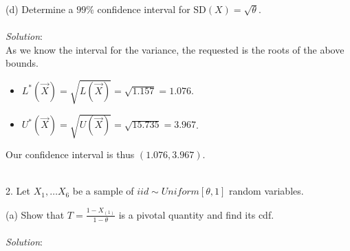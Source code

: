 \documentclass[12pt]{article}
\newcommand{\XB}{\color{black}}
\newcommand{\XBB}{\color{blue}}
\newcommand{\ds}{\displaystyle}
\begin{document}
\vspace{2.5mm}

(d) Determine a $ 99\% $ confidence interval for $ \text{SD}(X) = \sqrt{\theta} $. \\
\vspace{2.5mm} \\
\textit{Solution}:
\vspace{2.5mm} \\

\noindent
As we know the interval for the variance, the requested is the roots of the above bounds. \\

\begin{itemize}
    \item $ \ds L^{*}(\overrightarrow{X}) = \sqrt{L(\overrightarrow{X})} = \sqrt{1.157} = 1.076 $. \\
    \item $ \ds U^{*}(\overrightarrow{X}) = \sqrt{U(\overrightarrow{X})} = \sqrt{15.735} = 3.967 $. \\
\end{itemize}

\noindent
Our confidence interval is thus $ (1.076, 3.967) $. \\

\vspace{2.5mm}

\newpage
\XBB\hrulefill\XB \\

2. Let $ X_{1}, \dots X_{6} $ be a sample of $ iid \sim Uniform[\theta, 1] $ random variables. \\ 

\XBB\hrulefill\XB 
\vspace{5mm} 

(a) Show that $ \ds T = \frac{1 - X_{(1)}}{1 - \theta} $ is a pivotal quantity and find its cdf. \\
\vspace{2.5mm} \\
\textit{Solution}:
\vspace{2.5mm} \\
\end{document}
